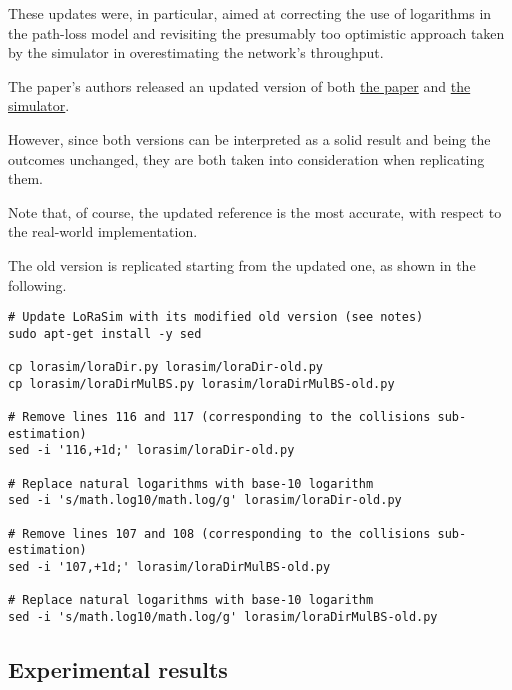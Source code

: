 \documentclass[a4paper,11pt]{article} %
\begin{document}
    \smallskip

    These updates were, in particular, aimed at correcting the use of logarithms in the path-loss model and revisiting the presumably too optimistic approach taken by the simulator in overestimating the network's throughput.

    \smallskip

    The paper's authors released an updated version of both \href{https://www.research.lancs.ac.uk/portal/en/publications/do-lora-lowpower-widearea-networks-scale(83d93e9d-8d77-4927-8f9c-cdca397fe355).html}{the paper} and \href{https://www.lancaster.ac.uk/scc/sites/lora/lorasim-20170710.tgz}{the simulator}.

    \smallskip

    However, since both versions can be interpreted as a solid result and being the outcomes unchanged, they are both taken into consideration when replicating them.

    \medskip

    Note that, of course, the updated reference is the most accurate, with respect to the real-world implementation.

    \medskip

    The old version is replicated starting from the updated one, as shown in the following.

    \begin{verbatim}
# Update LoRaSim with its modified old version (see notes)
sudo apt-get install -y sed

cp lorasim/loraDir.py lorasim/loraDir-old.py
cp lorasim/loraDirMulBS.py lorasim/loraDirMulBS-old.py

# Remove lines 116 and 117 (corresponding to the collisions sub-estimation)
sed -i '116,+1d;' lorasim/loraDir-old.py

# Replace natural logarithms with base-10 logarithm
sed -i 's/math.log10/math.log/g' lorasim/loraDir-old.py

# Remove lines 107 and 108 (corresponding to the collisions sub-estimation)
sed -i '107,+1d;' lorasim/loraDirMulBS-old.py

# Replace natural logarithms with base-10 logarithm
sed -i 's/math.log10/math.log/g' lorasim/loraDirMulBS-old.py
    \end{verbatim}

    \newpage

    \subsection{Experimental results}\label{subsec:experimental-results}
\end{document}
